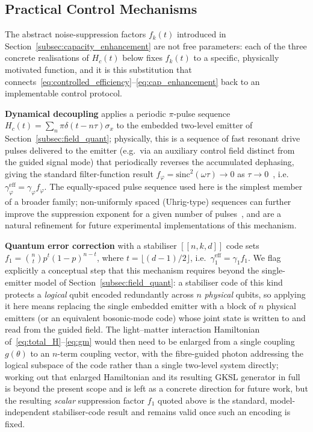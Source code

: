 \documentclass[journal,twocolumn]{IEEEtran}
\theoremstyle{definition}
\theoremstyle{plain}
\begin{document}
\subsection{Practical Control Mechanisms}

The abstract noise-suppression factors $f_k(t)$ introduced in
Section~\ref{subsec:capacity_enhancement} are not free parameters:
each of the three concrete realisations of $H_c(t)$ below fixes
$f_k(t)$ to a specific, physically motivated function, and it is
this substitution that connects~\eqref{eq:controlled_efficiency}--\eqref{eq:cap_enhancement}
back to an implementable control protocol.

\textbf{Dynamical decoupling} applies a periodic
$\pi$-pulse sequence $H_c(t) = \sum_n \pi\delta(t-n\tau)\sigma_x$ to
the embedded two-level emitter of Section~\ref{subsec:field_quant};
physically, this is a sequence of fast resonant drive pulses
delivered to the emitter (e.g.\ via an auxiliary control field
distinct from the guided signal mode) that periodically reverses the
accumulated dephasing, giving the standard filter-function result
$f_\varphi = \mathrm{sinc}^2(\omega\tau) \to 0$ as $\tau \to
0$~\cite{viola1998,uhrig2007}, i.e.\ $\gamma_\varphi^{\mathrm{eff}} =
\gamma_\varphi f_\varphi$. The equally-spaced pulse sequence used
here is the simplest member of a broader family; non-uniformly
spaced (Uhrig-type) sequences can further improve the suppression
exponent for a given number of pulses~\cite{uhrig2007}, and are a
natural refinement for future experimental implementations of this
mechanism.

\textbf{Quantum error correction} with a stabiliser $[[n,k,d]]$
code sets $f_1 = \binom{n}{t} p^t (1-p)^{n-t}$, where $t =
\lfloor(d-1)/2\rfloor$, i.e.\ $\gamma_1^{\mathrm{eff}} = \gamma_1
f_1$. We flag explicitly a conceptual step that this mechanism
requires beyond the single-emitter model of
Section~\ref{subsec:field_quant}: a stabiliser code of this kind
protects a \emph{logical} qubit encoded redundantly across $n$
\emph{physical} qubits, so applying it here means replacing the
single embedded emitter with a block of $n$ physical emitters (or
an equivalent bosonic-mode code) whose joint state is written to
and read from the guided field. The light--matter interaction
Hamiltonian of~\eqref{eq:total_H}--\eqref{eq:gm} would then need to
be enlarged from a single coupling $g(\theta)$ to an $n$-term
coupling vector, with the fibre-guided photon addressing the logical
subspace of the code rather than a single two-level system directly;
working out that enlarged Hamiltonian and its resulting GKSL
generator in full is beyond the present scope and is left as a
concrete direction for future work, but the resulting \emph{scalar}
suppression factor $f_1$ quoted above is the standard,
model-independent stabiliser-code result and remains valid once such
an encoding is fixed.
\end{document}
